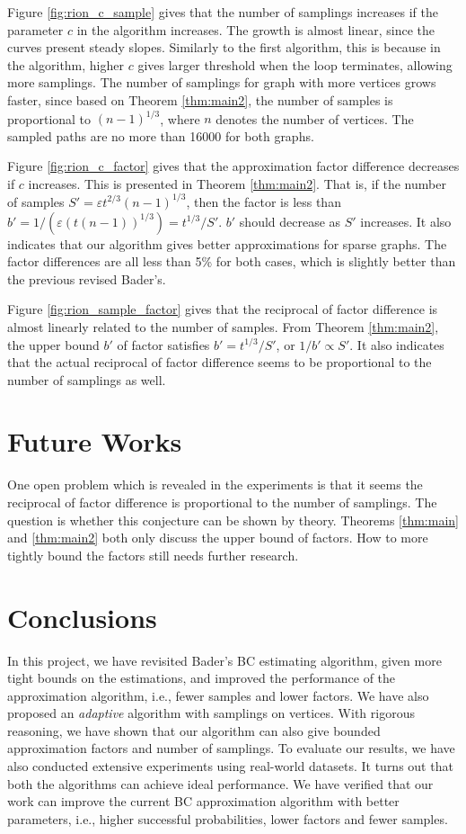 \documentclass[10pt]{article}
\begin{document}
Figure \ref{fig:rion_c_sample} gives that the number of samplings increases if the parameter $c$ in the algorithm increases. The growth is almost linear, since the curves present steady slopes. Similarly to the first algorithm, this is because in the algorithm, higher $c$ gives larger threshold when the loop terminates, allowing more samplings. The number of samplings for graph with more vertices grows faster, since based on Theorem \ref{thm:main2}, the number of samples is proportional to $(n-1)^{1/3}$, where $n$ denotes the number of vertices. The sampled paths are no more than 16000 for both graphs.

Figure \ref{fig:rion_c_factor} gives that the approximation factor difference decreases if $c$ increases. This is presented in Theorem \ref{thm:main2}. That is, if the number of samples $S'=\varepsilon t^{2/3}(n-1)^{1/3}$, then the factor is less than $b' = 1/(\varepsilon (t(n-1))^{1/3}) = t^{1/3}/S'$. $b'$ should decrease as $S'$ increases. It also indicates that our algorithm gives better approximations for sparse graphs. The factor differences are all less than 5\% for both cases, which is slightly better than the previous revised Bader's.

Figure \ref{fig:rion_sample_factor} gives that the reciprocal of factor difference is almost linearly related to the number of samples. From Theorem \ref{thm:main2}, the upper bound $b'$ of factor satisfies $b' = t^{1/3}/S'$, or $1/b' \propto S'$. It also indicates that the actual reciprocal of factor difference seems to be proportional to the number of samplings as well.

\section{Future Works}
One open problem which is revealed in the experiments is that it seems the reciprocal of factor difference is proportional to the number of samplings. The question is whether this conjecture can be shown by theory. Theorems \ref{thm:main} and \ref{thm:main2} both only discuss the upper bound of factors. How to more tightly bound the factors still needs further research.

\section{Conclusions}
In this project, we have revisited Bader's BC estimating algorithm, given more tight bounds on the estimations, and improved the performance of the approximation algorithm, i.e., fewer samples and lower factors. We have also proposed an \emph{adaptive} algorithm with samplings on vertices. With rigorous reasoning, we have shown that our algorithm can also give bounded approximation factors and number of samplings. To evaluate our results, we have also conducted extensive experiments using real-world datasets. It turns out that both the algorithms can achieve ideal performance. We have verified that our work can improve the current BC approximation algorithm with better parameters, i.e., higher successful probabilities, lower factors and fewer samples.



\end{document}
